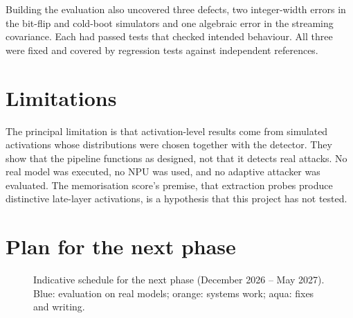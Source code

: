 Building the evaluation also uncovered three defects, two integer-width errors in the bit-flip
and cold-boot simulators and one algebraic error in the streaming covariance. Each had passed
tests that checked intended behaviour. All three were fixed and covered by regression tests
against independent references.

\section{Limitations}

The principal limitation is that activation-level results come from simulated activations whose
distributions were chosen together with the detector. They show that the pipeline functions as
designed, not that it detects real attacks. No real model was executed, no NPU was used, and no
adaptive attacker was evaluated. The memorisation score's premise, that extraction probes produce
distinctive late-layer activations, is a hypothesis that this project has not tested.

\section{Plan for the next phase}

\begin{figure}[t]
\centering
{}
\caption{Indicative schedule for the next phase (December 2026 -- May 2027). Blue: evaluation on
real models; orange: systems work; aqua: fixes and writing.}
\label{fig:gantt}
\end{figure}

